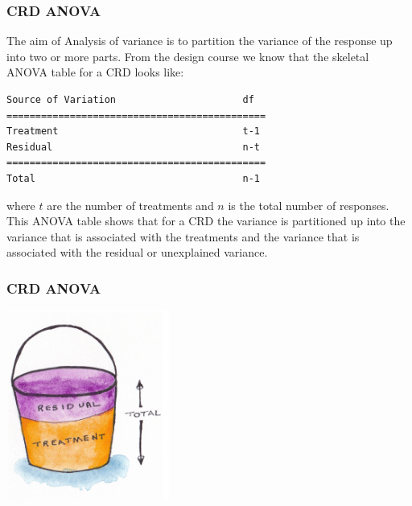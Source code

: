 \begin{frame}[fragile]\frametitle{CRD ANOVA}
The aim of Analysis of variance is to partition the variance of the response up into two or more parts. From the design
course we know that the skeletal ANOVA table for a CRD looks like:

\begin{verbatim}
Source of Variation                      df
=============================================
Treatment                                t-1
Residual                                 n-t
=============================================
Total                                    n-1
\end{verbatim}

where $t$ are the number of treatments and $n$ is the total number of responses. This ANOVA table shows that for a CRD
the variance is partitioned up into the variance that is associated with the treatments and the variance that is
associated with the residual or unexplained variance.
\end{frame}

\begin{frame}\frametitle{CRD ANOVA}
\centering
\includegraphics[width = 0.4\textwidth]{crdbucket.png}
\end{frame}


